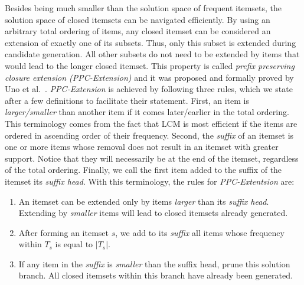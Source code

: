\documentclass[letterpaper,12pt,titlepage,oneside,final]{book}
\begin{document}
Besides being much smaller than the solution space of frequent itemsets,
the solution space of closed itemsets can be navigated efficiently.
By using an arbitrary total ordering of items, any closed itemset can be
considered an extension of exactly one of its subsets.
Thus, only this subset is extended during candidate generation.
All other subsets do not need to be extended by items that would lead to
the longer closed itemset.
This property is called \emph{prefix preserving closure extension
(PPC-Extension)} and it was proposed and formally proved by
Uno et al.~\cite{uno2004lcm}.
\emph{PPC-Extension} is achieved by following three rules, which we state
after a few definitions to facilitate their statement.
First, an item is \emph{larger/smaller} than another item if it comes
later/earlier in the total ordering.
This terminology comes from the fact that LCM is most efficient if the items
are ordered in ascending order of their frequency.
Second, the \emph{suffix} of an itemset is one or more items whose removal
does not result in an itemset with greater support.
Notice that they will necessarily be at the end of the itemset,
regardless of the total ordering.
Finally, we call the first item added to the suffix of the itemset its
\emph{suffix head}.
With this terminology, the rules for \emph{PPC-Extentsion} are:
\begin{enumerate}
\item An itemset can be extended only by items \emph{larger} than its \emph{suffix head}. Extending by \emph{smaller} items will lead to closed itemsets already generated.
\item After forming an itemset $s$, we add to its \emph{suffix} all items whose frequency within $T_s$ is equal to $|T_s|$.
\item If any item in the \emph{suffix} is \emph{smaller} than the suffix head, prune this solution branch. All closed itemsets within this branch have already been generated.
\end{enumerate}
 
\end{document}
